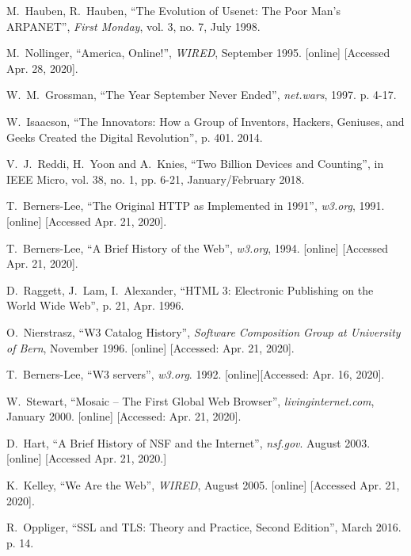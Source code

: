 \documentclass[journal]{IEEEtran}
\begin{document}
\begin{thebibliography}{6}
 M.~Hauben, R.~Hauben, \enquote{The Evolution of Usenet: The Poor Man's ARPANET}, \emph{First Monday}, vol. 3, no. 7, July 1998.

 M.~Nollinger, \enquote{America, Online!}, \emph{WIRED}, September 1995. [online] [Accessed Apr. 28, 2020].

 W.~M.~Grossman, \enquote{The Year September Never Ended}, \emph{net.wars}, 1997. p. 4-17.

 W.~Isaacson, \enquote{The Innovators: How a Group of Inventors, Hackers, Geniuses, and Geeks Created the Digital Revolution}, p. 401. 2014.

 V.~J.~Reddi, H.~Yoon and A.~Knies, \enquote{Two Billion Devices and Counting}, in IEEE Micro, vol. 38, no. 1, pp. 6-21, January/February 2018.

 T.~Berners-Lee, \enquote{The Original HTTP as Implemented in 1991}, \emph{w3.org}, 1991. [online] [Accessed Apr. 21, 2020].

 T.~Berners-Lee, \enquote{A Brief History of the Web}, \emph{w3.org}, 1994. [online] [Accessed Apr. 21, 2020].

 D.~Raggett, J.~Lam, I.~Alexander, \enquote{HTML 3: Electronic Publishing on the World Wide Web}, p. 21, Apr. 1996.

 O.~Nierstrasz, \enquote{W3 Catalog History}, \emph{Software Composition Group at University of Bern}, November 1996. [online] [Accessed: Apr. 21, 2020].

 T.~Berners-Lee, \enquote{W3 servers}, \emph{w3.org}. 1992. [online][Accessed: Apr. 16, 2020].

 W.~Stewart, \enquote{Mosaic -- The First Global Web Browser}, \emph{livinginternet.com}, January 2000. [online] [Accessed: Apr. 21, 2020].

 D.~Hart, \enquote{A Brief History of NSF and the Internet}, \emph{nsf.gov}. August 2003. [online] [Accessed Apr. 21, 2020.]

 K.~Kelley, \enquote{We Are the Web}, \emph{WIRED}, August 2005. [online] [Accessed Apr. 21, 2020].

 R.~Oppliger, \enquote{SSL and TLS: Theory and Practice, Second Edition}, March 2016. p. 14.


\end{thebibliography}
\end{document}
